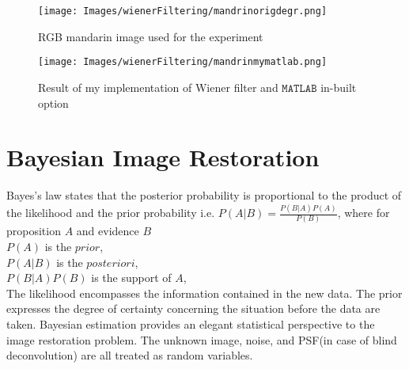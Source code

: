 \documentclass[a4paper]{book}
\begin{document}
\begin{figure}[H]		
	\begin{center}
		\texttt{[image: Images/wienerFiltering/mandrinorigdegr.png]}
		\caption{RGB mandarin image used for the experiment}
		\label{fig3.6}
	\end{center}
\end{figure}


\begin{figure}[H]		
	\centering
	\texttt{[image: Images/wienerFiltering/mandrinmymatlab.png]}	
	\caption{Result of my implementation of Wiener filter and $ \mathtt{MATLAB} $ in-built option}
	\label{fig3.7}
\end{figure}
\newpage
\section{\Large Bayesian Image Restoration} \label{BIR}
Bayes’s law states that the posterior probability is proportional to the product of the
likelihood and the prior probability i.e. $ P(A|B) = \frac{P(B|A)P(A)}{P(B)} $, where for proposition $ A $ and evidence $ B $\\
$ P(A) $ is the $ prior $, \\
$ P(A|B) $ is the $ posteriori $,  \\
$ P(B|A)P(B) $ is the support of $ A $, \\ 
The likelihood encompasses the information contained in the new
data. The prior expresses the degree of certainty concerning the situation before the data are taken. Bayesian estimation provides an elegant statistical perspective to the image restoration problem. The unknown image, noise, and PSF(in case of blind deconvolution) are all treated as random variables. 
\end{document}
